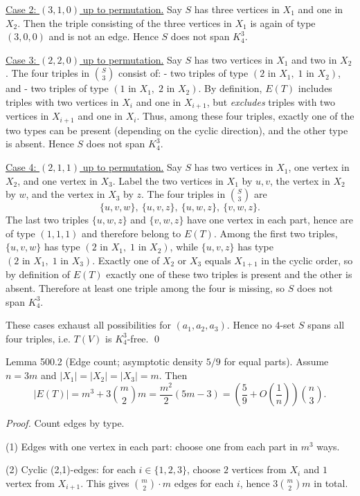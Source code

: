 \underline{Case 2: $(3,1,0)$ up to permutation.}
Say $S$ has three vertices in $X_1$ and one in $X_2$. Then the triple consisting of the three vertices in $X_1$ is again of type $(3,0,0)$ and is not an edge. Hence $S$ does not span $K_4^3$.

\underline{Case 3: $(2,2,0)$ up to permutation.}
Say $S$ has two vertices in $X_1$ and two in $X_2$. The four triples in $\binom{S}{3}$ consist of:
- two triples of type $(2\text{ in }X_1,\;1\text{ in }X_2)$, and
- two triples of type $(1\text{ in }X_1,\;2\text{ in }X_2)$.
By definition, $E(T)$ includes triples with two vertices in $X_i$ and one in $X_{i+1}$, but \emph{excludes} triples with two vertices in $X_{i+1}$ and one in $X_i$.
Thus, among these four triples, exactly one of the two types can be present (depending on the cyclic direction), and the other type is absent. Hence $S$ does not span $K_4^3$.

\underline{Case 4: $(2,1,1)$ up to permutation.}
Say $S$ has two vertices in $X_1$, one vertex in $X_2$, and one vertex in $X_3$.
Label the two vertices in $X_1$ by $u,v$, the vertex in $X_2$ by $w$, and the vertex in $X_3$ by $z$.
The four triples in $\binom{S}{3}$ are
\[\{u,v,w\},\ \{u,v,z\},\ \{u,w,z\},\ \{v,w,z\}.
\]
The last two triples $\{u,w,z\}$ and $\{v,w,z\}$ have one vertex in each part, hence are of type $(1,1,1)$ and therefore belong to $E(T)$.
Among the first two triples, $\{u,v,w\}$ has type $(2\text{ in }X_1,\;1\text{ in }X_2)$, while $\{u,v,z\}$ has type $(2\text{ in }X_1,\;1\text{ in }X_3)$.
Exactly one of $X_2$ or $X_3$ equals $X_{1+1}$ in the cyclic order, so by definition of $E(T)$ exactly one of these two triples is present and the other is absent. Therefore at least one triple among the four is missing, so $S$ does not span $K_4^3$.

These cases exhaust all possibilities for $(a_1,a_2,a_3)$. Hence no $4$-set $S$ spans all four triples, i.e. $T(V)$ is $K_4^3$-free. \qed

Lemma 500.2 (Edge count; asymptotic density $5/9$ for equal parts).
Assume $n=3m$ and $\lvert X_1\rvert=\lvert X_2\rvert=\lvert X_3\rvert=m$. Then
\[
\lvert E(T)\rvert 
= m^3 + 3\binom{m}{2}m
= \frac{m^2}{2}(5m-3)
= \left(\frac{5}{9}+O\left(\frac{1}{n}\right)\right)\binom{n}{3}.
\]

\emph{Proof.}
Count edges by type.

(1) Edges with one vertex in each part: choose one from each part in $m^3$ ways.

(2) Cyclic (2,1)-edges: for each $i\in\{1,2,3\}$, choose $2$ vertices from $X_i$ and $1$ vertex from $X_{i+1}$. This gives $\binom{m}{2}\cdot m$ edges for each $i$, hence $3\binom{m}{2}m$ in total.

